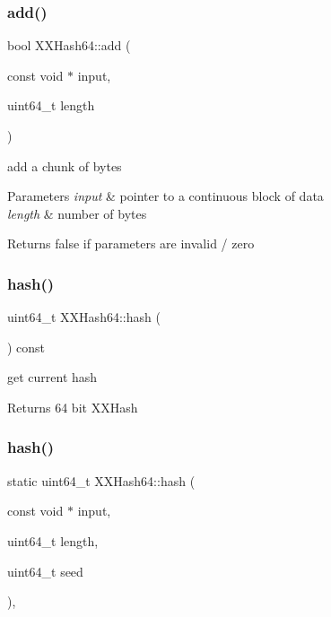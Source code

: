 \subsubsection{\texorpdfstring{add()}{add()}}
{\footnotesize\ttfamily bool X\+X\+Hash64\+::add (\begin{DoxyParamCaption}\item[{const void $\ast$}]{input,  }\item[{uint64\+\_\+t}]{length }\end{DoxyParamCaption})\hspace{0.3cm}{\ttfamily [inline]}}



add a chunk of bytes 


\begin{DoxyParams}{Parameters}
{\em input} & pointer to a continuous block of data \\
\hline
{\em length} & number of bytes \\
\hline
\end{DoxyParams}
\begin{DoxyReturn}{Returns}
false if parameters are invalid / zero 
\end{DoxyReturn}
\mbox{\label{class_x_x_hash64_ad7666ede7a694debd1cc018bbd98d21b}} 
\subsubsection{\texorpdfstring{hash()}{hash()}\hspace{0.1cm}{\footnotesize\ttfamily [1/2]}}
{\footnotesize\ttfamily uint64\+\_\+t X\+X\+Hash64\+::hash (\begin{DoxyParamCaption}{ }\end{DoxyParamCaption}) const\hspace{0.3cm}{\ttfamily [inline]}}



get current hash 

\begin{DoxyReturn}{Returns}
64 bit X\+X\+Hash 
\end{DoxyReturn}
\mbox{\label{class_x_x_hash64_af555a886b8ae54d6d1a18ecd8e454c6d}} 
\subsubsection{\texorpdfstring{hash()}{hash()}\hspace{0.1cm}{\footnotesize\ttfamily [2/2]}}
{\footnotesize\ttfamily static uint64\+\_\+t X\+X\+Hash64\+::hash (\begin{DoxyParamCaption}\item[{const void $\ast$}]{input,  }\item[{uint64\+\_\+t}]{length,  }\item[{uint64\+\_\+t}]{seed }\end{DoxyParamCaption})\hspace{0.3cm}{\ttfamily [inline]}, {\ttfamily [static]}}



